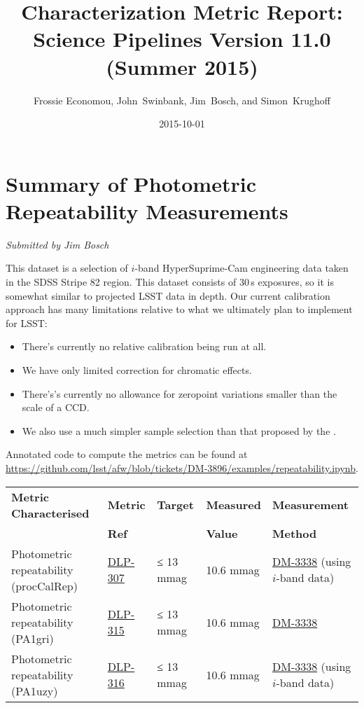 \documentclass[DM,toc,lsstdraft]{lsstdoc}
\title[Summer 2015 Characterization Report]{Characterization Metric Report: Science Pipelines Version 11.0 (Summer 2015)}
\author{Frossie Economou, John~Swinbank, Jim~Bosch, and Simon~Krughoff}
\date{2015-10-01}
\begin{document}
\maketitle

\section{Summary of Photometric Repeatability
Measurements}\label{summary-of-photometric-repeatability-measurements}

\emph{Submitted by Jim Bosch}

This dataset is a selection of $i$-band HyperSuprime-Cam engineering data
taken in the SDSS Stripe 82 region. This dataset consists of 30\,s
exposures, so it is somewhat similar to projected LSST data in depth.
Our current calibration approach has many limitations relative to what
we ultimately plan to implement for LSST:

\begin{itemize}
\item
  There's currently no relative calibration being run at all.
\item
  We have only limited correction for chromatic effects.
\item
  There's's currently no allowance for zeropoint variations smaller than
  the scale of a CCD.
\item
  We also use a much simpler sample selection than that proposed by the
  \SRD.
\end{itemize}

Annotated code to compute the metrics can be found at
\url{https://github.com/lsst/afw/blob/tickets/DM-3896/examples/repeatability.ipynb}.

\begin{small}
\begin{longtable}[]{@{}lllll@{}}
\toprule
\textbf{Metric Characterised} & \textbf{Metric} & \textbf{Target} &
\textbf{Measured} & \textbf{Measurement}\tabularnewline
 & \textbf{Ref} &  &
\textbf{Value} & \textbf{Method}\tabularnewline
\midrule
\endhead
Photometric repeatability (procCalRep) &
\href{https://jira.lsstcorp.org/browser/DLP-307}{DLP-307} & ≤ 13 mmag &
10.6 mmag & \href{https://jira.lsstcorp.org/browse/DM-3338}{DM-3338}
(using $i$-band data)\tabularnewline
Photometric repeatability (PA1gri) &
\href{https://jira.lsstcorp.org/browse/DLP-315}{DLP-315} & ≤ 13 mmag &
10.6 mmag &
\href{https://jira.lsstcorp.org/browse/DM-3338}{DM-3338}\tabularnewline
Photometric repeatability (PA1uzy) &
\href{https://jira.lsstcorp.org/browse/DLP-316}{DLP-316} & ≤ 13 mmag &
10.6 mmag & \href{https://jira.lsstcorp.org/browse/DM-3338}{DM-3338}
(using $i$-band data)\tabularnewline
\bottomrule
\end{longtable}
\end{small}
\end{document}
